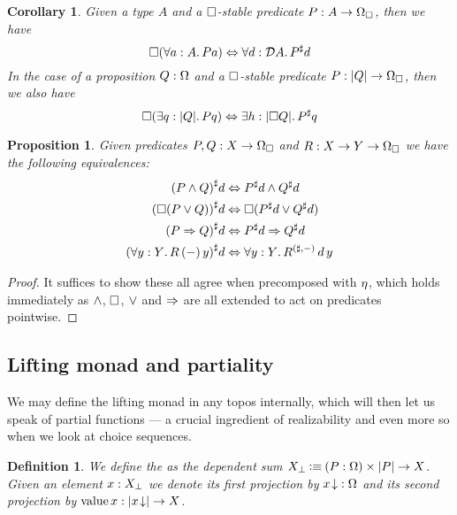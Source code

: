 \documentclass[11pt]{article}
\newtheorem{prop}[thrm]{Proposition}
\newtheorem{defn}[thrm]{Definition}
\newtheorem{coro}[thrm]{Corollary}
\begin{document}
\begin{coro}
  Given a type \(A\) and a \(\Box\)-stable predicate
  \(P:A\to\Omega_\Box\), then we have
  \[
    \Box{(\forall{a:A}.\,{Pa})}
    \Leftrightarrow
    \forall{d:\mathcal{D}{A}}.\,{{P}^\sharp d}
  \]
  In the case of a proposition \(Q:\Omega\) and
  a \(\Box\)-stable predicate \(P:|{Q}|\to\Omega_\Box\), then we also have
  \[
    \Box{(\exists{q:|{Q}|}.\,{Pq})}
    \Leftrightarrow
    \exists{h:|{\Box{Q}}|}.\,{{P}^\sharp q}
  \]
\end{coro}

\begin{prop}\label{prop:heyting-structure-predicate-extension}
  Given predicates \(P,Q : X \to \Omega_\Box\) and \(R : X \to Y \to \Omega_\Box\) we
  have the following equivalences:
  \begin{align*}
    {({P}\land{Q})}^\sharp d
    &\Leftrightarrow
      {{P}^\sharp d}\land{{Q}^\sharp d}
    \\
    {(\Box{({P}\lor{Q})})}^\sharp d
    &\Leftrightarrow
      \Box{({{P}^\sharp d}\lor{{Q}^\sharp d})}
    \\
    {({P}\Rightarrow{Q})}^\sharp d
    &\Leftrightarrow
      {{P}^\sharp d}\Rightarrow{{Q}^\sharp d}
    \\
    {(\forall{y:Y}.\,{R\,(-)\,y})}^\sharp d
    &\Leftrightarrow
      \forall{y:Y}.\,{{R}^{({\sharp,-})}\,d\,y}
  \end{align*}
\end{prop}
\begin{proof}
  It suffices to show these all agree when precomposed with \(\eta\), which
  holds immediately as \(\land\), \(\Box\), \(\lor\) and
  \(\Rightarrow\) are all extended to act on predicates pointwise.
\end{proof}

\subsection{Lifting monad and partiality}

We may define the lifting monad in any topos internally, which will then
let us speak of partial functions --- a crucial ingredient of realizability
and even more so when we look at choice sequences.

\begin{defn}\label{defn:lifting}
  We define the  as the dependent sum
  \({X}_\bot \mathbin{\vcentcolon\equiv} {(P : \Omega)}\times{|{P}|\to X}\).
  Given an element \(x : {X}_\bot\) we denote its first projection by
  \({{x}\!\downarrow} : \Omega\) and its second projection by
  \(\text{value}\,{x}: |{{{x}\!\downarrow}}| \to X\).
\end{defn}
\end{document}
